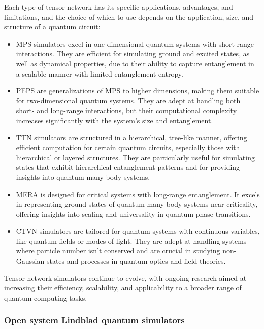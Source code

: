Each type of tensor network has its specific applications, advantages, and limitations, and the choice of which to use depends on the application, size, and structure of a quantum circuit:
\begin{itemize}
    
\item MPS simulators excel in one-dimensional quantum systems with short-range interactions. They are efficient for simulating ground and excited states, as well as dynamical properties, due to their ability to capture entanglement in a scalable manner with limited entanglement entropy.

\item  PEPS are generalizations of MPS to higher dimensions, making them suitable for two-dimensional quantum systems. They are adept at handling both short- and long-range interactions, but their computational complexity increases significantly with the system's size and entanglement.

\item  TTN simulators are structured in a hierarchical, tree-like manner, offering efficient computation for certain quantum circuits, especially those with hierarchical or layered structures. They are particularly useful for simulating states that exhibit hierarchical entanglement patterns and for providing insights into quantum many-body systems.

\item  MERA is designed for critical systems with long-range entanglement. It excels in representing ground states of quantum many-body systems near criticality, offering insights into scaling and universality in quantum phase transitions.

\item  CTVN simulators are tailored for quantum systems with continuous variables, like quantum fields or modes of light. They are adept at handling systems where particle number isn't conserved and are crucial in studying non-Gaussian states and processes in quantum optics and field theories.
\end{itemize}

Tensor network simulators continue to evolve, with ongoing research aimed at increasing their efficiency, scalability, and applicability to a broader range of quantum computing tasks.


\subsubsection{Open system Lindblad quantum simulators}

